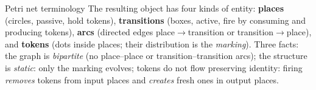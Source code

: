 \begin{definitionbox}{Petri net terminology}
The resulting object has four kinds of entity: \textbf{places} (circles, passive, hold tokens), \textbf{transitions} (boxes, active, fire by consuming and producing tokens), \textbf{arcs} (directed edges place$\to$transition or transition$\to$place), and \textbf{tokens} (dots inside places; their distribution is the \emph{marking}). Three facts: the graph is \emph{bipartite} (no place--place or transition--transition arcs); the structure is \emph{static}: only the marking evolves; tokens do not flow preserving identity: firing \emph{removes} tokens from input places and \emph{creates} fresh ones in output places.
\end{definitionbox}

